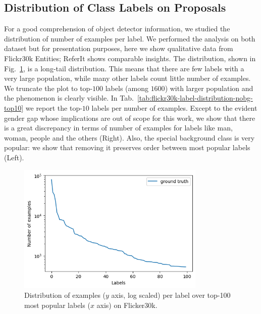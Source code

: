 \subsection{Distribution of Class Labels on Proposals}

For a good comprehension of object detector information, we studied
the distribution of number of examples per label. We performed the
analysis on both dataset but for presentation purposes, here we show
qualitative data from Flickr30k Entities; ReferIt shows comparable
insights. The distribution, shown in
Fig.~\ref{fig:flickr30k-label-distribution-top10}, is a long-tail
distribution. This means that there are few labels with a very large
population, while many other labels count little number of examples.
We truncate the plot to top-$100$ labels (among $1600$) with larger
population and the phenomenon is clearly visible. In
Tab.~\ref{tab:flickr30k-label-distribution-nobg-top10} we report the
top-$10$ labels per number of examples. Except to the evident gender
gap whose implications are out of scope for this work, we show that
there is a great discrepancy in terms of number of examples for labels
like man, woman, people and the others (Right). Also, the special
background class is very popular: we show that removing it preserves
order between most popular labels (Left).

\begin{figure}
  \includegraphics[width=0.8\textwidth]{figures/number-of-examples-per-label-over-top-100-most-popular-labels.png}
  \caption[Number of examples per label over top-100 most popular labels on Flicker30k]{Distribution of examples ($y$ axis, log scaled) per label over top-100 most popular labels ($x$ axis) on Flicker30k.}
  \label{fig:flickr30k-label-distribution-top10}
\end{figure}

